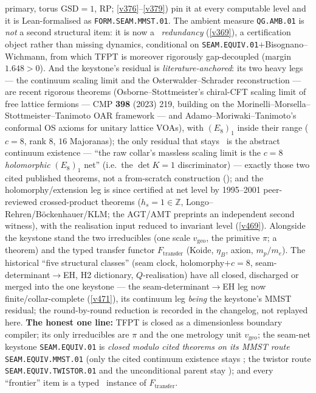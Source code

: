 \documentclass[11pt,a4paper]{article}
\newcommand{\Z}{\mathbb Z}
\begin{document}
\begin{keybox}
primary, torus $\mathrm{GSD}{=}1$, RP; \vref{v376}--\vref{v379}) pin it at every computable level and it is
Lean-formalised as \texttt{FORM.SEAM.MMST.01}.  The ambient measure
\texttt{QG.AMB.01} is \emph{not} a second structural item: it is now a \mC\ \emph{redundancy} (\vref{v369}), a
certification object rather than missing dynamics, conditional on \texttt{SEAM.EQUIV.01}${+}$Bisognano--Wichmann,
from which TFPT is moreover rigorously gap-decoupled (margin $1.648>0$).  And the keystone's residual is
\emph{literature-anchored}: its two heavy legs ---
the continuum scaling limit and the Osterwalder--Schrader reconstruction --- are recent rigorous theorems
(Osborne--Stottmeister's chiral-CFT scaling limit of free lattice fermions --- CMP \textbf{398} (2023) 219,
building on the Morinelli--Morsella--Stottmeister--Tanimoto OAR framework --- and
Adamo--Moriwaki--Tanimoto's conformal OS axioms for unitary lattice VOAs), with $(E_8)_1$ inside their range
($c{=}8$, rank $8$, $16$ Majoranas); the only residual that stays \mO\ is the abstract continuum existence ---
``the raw collar's massless scaling limit is the $c{=}8$ \emph{holomorphic} $(E_8)_1$ net'' (i.e.\ the $\det K{=}1$
discriminator) --- exactly those two cited published theorems, not a from-scratch
construction (); and the holomorphy/extension leg is since certified at net
level by 1995--2001 peer-reviewed crossed-product theorems ($h_s{=}1{\in}\Z$, Longo--Rehren/B\"ockenhauer/KLM;
the AGT/AMT preprints an independent second witness), with the realisation input reduced to invariant level
(\vref{v469}).  Alongside the keystone stand the two irreducibles (one scale
$v_{\mathrm{geo}}$, the primitive $\pi$; a theorem) and the typed transfer functor $F_{\mathrm{transfer}}$ (Koide,
$\eta_B$, axion, $m_p/m_e$). The historical ``five structural classes'' (seam clock, holomorphy$+c{=}8$,
seam-determinant$\to$EH, H2 dictionary, $Q$-realisation) have all closed, discharged or merged into the one
keystone --- the seam-determinant$\to$EH leg now finite/collar-complete (\vref{v471}), its continuum leg
\emph{being} the keystone's MMST residual; the round-by-round reduction is recorded in the changelog, not
replayed here.
\textbf{The honest one line:} TFPT is closed as a dimensionless boundary compiler; its only irreducibles
are $\pi$ and the one metrology unit $v_{\mathrm{geo}}$; the seam-net keystone \texttt{SEAM.EQUIV.01} is
\emph{closed modulo cited theorems on its MMST route} \texttt{SEAM.EQUIV.MMST.01} (only the cited continuum existence
stays \mO; the twistor route \texttt{SEAM.EQUIV.TWISTOR.01} and the unconditional parent stay \mO); and every ``frontier'' item is
a typed \mC\ instance of $F_{\mathrm{transfer}}$.
\end{keybox}
\end{document}
